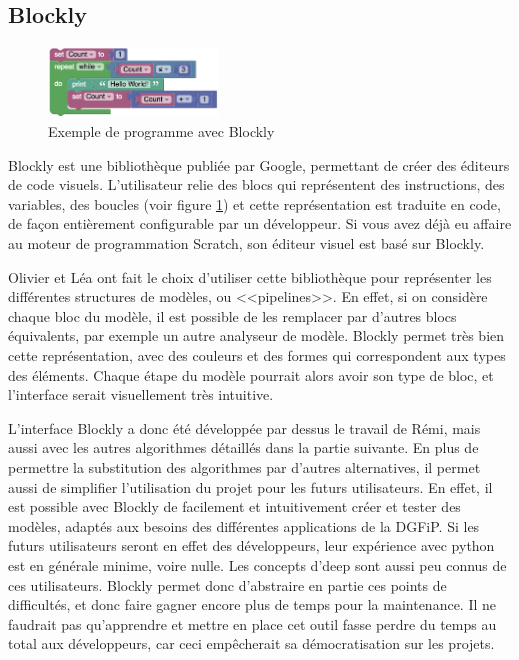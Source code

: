 \documentclass[openany, 11pt]{memoir}
\begin{document}
\subsection{Blockly}

\begin{figure}[ht]
	\centering
	\includegraphics[width=0.4\textwidth]{images/blockly.png}
	\caption{Exemple de programme avec Blockly}
	\label{blockly}
\end{figure}

Blockly est une bibliothèque publiée par Google, permettant de créer des éditeurs de code visuels. L'utilisateur relie des blocs qui représentent des instructions, des variables, des boucles (voir figure \ref{blockly}) et cette représentation est traduite en code, de façon entièrement configurable par un développeur. Si vous avez déjà eu affaire au moteur de programmation Scratch, son éditeur visuel est basé sur Blockly.

\bigskip
Olivier et Léa ont fait le choix d'utiliser cette bibliothèque pour représenter les différentes structures de modèles, ou <<pipelines>>. En effet, si on considère chaque bloc du modèle, il est possible de les remplacer par d'autres blocs équivalents, par exemple un autre analyseur de modèle. Blockly permet très bien cette représentation, avec des couleurs et des formes qui correspondent aux types des éléments. Chaque étape du modèle pourrait alors avoir son type de bloc, et l'interface serait visuellement très intuitive.

L'interface Blockly a donc été développée par dessus le travail de Rémi, mais aussi avec les autres algorithmes détaillés dans la partie suivante. En plus de permettre la substitution des algorithmes par d'autres alternatives, il permet aussi de simplifier l'utilisation du projet pour les futurs utilisateurs. En effet, il est possible avec Blockly de facilement et intuitivement créer et tester des modèles, adaptés aux besoins des différentes applications de la \gls{DGFiP}. Si les futurs utilisateurs seront en effet des développeurs, leur expérience avec python est en générale minime, voire nulle. Les concepts d'\gls{deep} sont aussi peu connus de ces utilisateurs. Blockly permet donc d'abstraire en partie ces points de difficultés, et donc faire gagner encore plus de temps pour la maintenance. Il ne faudrait pas qu'apprendre et mettre en place cet outil fasse perdre du temps au total aux développeurs, car ceci empêcherait sa démocratisation sur les projets.
\end{document}
